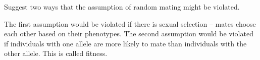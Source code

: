 \documentclass[addpoints,answers]{exam}
\begin{document}
\begin{questions}
    \question Suggest two ways that the assumption of random mating might be violated.

    \begin{solution}
      The first assumption would be violated if there is sexual selection -- mates choose each other based on their phenotypes. The second assumption would be violated if individuals with one allele are more likely to mate than individuals with the other allele. This is called fitness. 
    \end{solution}
    
\end{questions}
\end{document}
